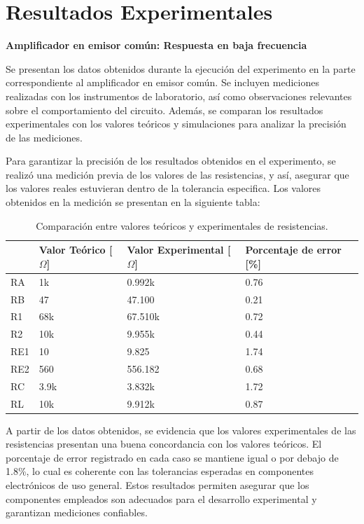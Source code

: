\documentclass[journal]{IEEEtran}
\begin{document}
\section{Resultados Experimentales}
\textbf{Amplificador en emisor común: Respuesta en baja frecuencia}
\par Se presentan los datos obtenidos durante la ejecución del experimento en la parte correspondiente al amplificador en emisor común. Se incluyen mediciones realizadas con los instrumentos de laboratorio, así como observaciones relevantes sobre el comportamiento del circuito. Además, se comparan los resultados experimentales con los valores teóricos y simulaciones para analizar la precisión de las mediciones.
\par Para garantizar la precisión de los resultados obtenidos en el experimento, se realizó una medición previa de los valores de las resistencias, y así, asegurar que los valores reales estuvieran dentro de la tolerancia especifica. Los valores obtenidos en la medición se presentan en la siguiente tabla:
\begin{table}[h]
    \caption{Comparación entre valores teóricos y experimentales de resistencias.}
    \centering
    \renewcommand{\arraystretch}{1.2} %
    \begin{tabular}{|l|p{2cm}|p{2cm}|p{2cm}|}
        \hline
        & \textbf{Valor Teórico [$\Omega$]} & \textbf{Valor Experimental [$\Omega$]} & \textbf{Porcentaje de error [\%]} \\
        \hline
        RA & 1k  & 0.992k  & 0.76 \\
        \hline
        RB & 47   & 47.100  & 0.21 \\
        \hline
        R1 & 68k & 67.510k & 0.72 \\
        \hline
        R2 & 10k & 9.955k & 0.44 \\
        \hline
        RE1 & 10 & 9.825 & 1.74 \\
        \hline
        RE2 & 560 & 556.182 & 0.68 \\
        \hline
        RC & 3.9k & 3.832k & 1.72 \\
        \hline
        RL & 10k & 9.912k & 0.87 \\
        \hline
    \end{tabular}
    \label{tab:resistencias}
\end{table}
\par A partir de los datos obtenidos, se evidencia que los valores experimentales de las resistencias presentan una buena concordancia con los valores teóricos. El porcentaje de error registrado en cada caso se mantiene igual o por debajo de 1.8\%, lo cual es coherente con las tolerancias esperadas en componentes electrónicos de uso general. Estos resultados permiten asegurar que los componentes empleados son adecuados para el desarrollo experimental y garantizan mediciones confiables.
\end{document}
